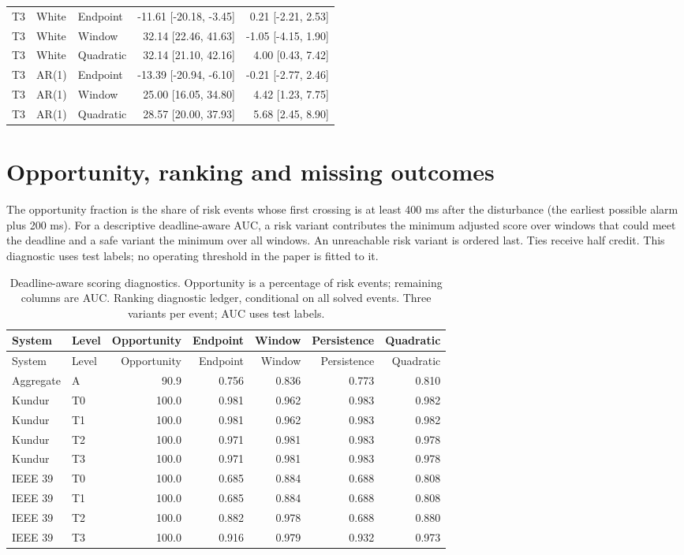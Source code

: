 \documentclass[10pt]{article}
\begin{document}
\begin{longtable}{lllrr}
T3 & White & Endpoint & -11.61 [-20.18, -3.45] & 0.21 [-2.21, 2.53] \\
T3 & White & Window & 32.14 [22.46, 41.63] & -1.05 [-4.15, 1.90] \\
T3 & White & Quadratic & 32.14 [21.10, 42.16] & 4.00 [0.43, 7.42] \\
T3 & AR(1) & Endpoint & -13.39 [-20.94, -6.10] & -0.21 [-2.77, 2.46] \\
T3 & AR(1) & Window & 25.00 [16.05, 34.80] & 4.42 [1.23, 7.75] \\
T3 & AR(1) & Quadratic & 28.57 [20.00, 37.93] & 5.68 [2.45, 8.90] \\
\bottomrule\end{longtable}\endgroup
\section{Opportunity, ranking and missing outcomes}
The opportunity fraction is the share of risk events whose first crossing is at least 400 ms after the disturbance (the earliest possible alarm plus 200 ms). For a descriptive deadline-aware AUC, a risk variant contributes the minimum adjusted score over windows that could meet the deadline and a safe variant the minimum over all windows. An unreachable risk variant is ordered last. Ties receive half credit. This diagnostic uses test labels; no operating threshold in the paper is fitted to it.
\begingroup\small\setlength{\tabcolsep}{3.8pt}
\begin{longtable}{llrrrrr}
\caption{Deadline-aware scoring diagnostics. Opportunity is a percentage of risk events; remaining columns are AUC. Ranking diagnostic ledger, conditional on all solved events. Three variants per event; AUC uses test labels.}\\
\toprule System & Level & Opportunity & Endpoint & Window & Persistence & Quadratic \\\midrule\endfirsthead
\toprule System & Level & Opportunity & Endpoint & Window & Persistence & Quadratic \\\midrule\endhead
Aggregate & A & 90.9 & 0.756 & 0.836 & 0.773 & 0.810 \\
Kundur & T0 & 100.0 & 0.981 & 0.962 & 0.983 & 0.982 \\
Kundur & T1 & 100.0 & 0.981 & 0.962 & 0.983 & 0.982 \\
Kundur & T2 & 100.0 & 0.971 & 0.981 & 0.983 & 0.978 \\
Kundur & T3 & 100.0 & 0.971 & 0.981 & 0.983 & 0.978 \\
IEEE 39 & T0 & 100.0 & 0.685 & 0.884 & 0.688 & 0.808 \\
IEEE 39 & T1 & 100.0 & 0.685 & 0.884 & 0.688 & 0.808 \\
IEEE 39 & T2 & 100.0 & 0.882 & 0.978 & 0.688 & 0.880 \\
IEEE 39 & T3 & 100.0 & 0.916 & 0.979 & 0.932 & 0.973 \\
\bottomrule\end{longtable}\endgroup
\end{document}
